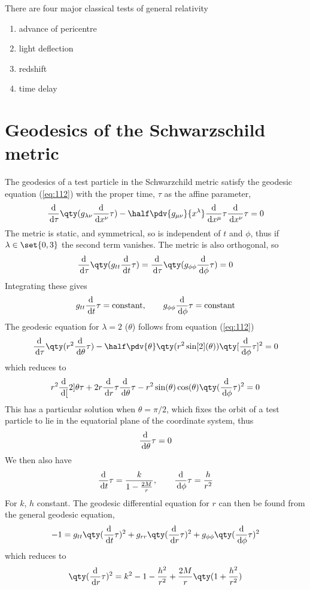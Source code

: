 There are four major classical tests of general relativity
\begin{enumerate}
\item advance of pericentre
\item light deflection
\item redshift
\item time delay
\end{enumerate}

\section{Geodesics of the Schwarzschild metric}
\label{sec:geod-schw-metr}

The geodesics of a test particle in the Schwarzchild metric satisfy
the geodesic equation (\ref{eq:112}) with the proper time, $\tau$ as
the affine parameter,
\begin{equation}
  \label{eq:141}
  \dv{\tau}\qty(g_{\lambda\nu} \dv{x^{\nu}}{\tau} ) - \half \pdv{g_{\mu \nu}}{x^{\lambda}} \dv{x^{\mu}}{\tau} \dv{x^{\nu}}{\tau} = 0
\end{equation}
The metric is static, and symmetrical, so is independent of $t$ and
$\phi$, thus if $\lambda \in \set{0,3}$ the second term vanishes. The
metric is also orthogonal, so
\[ \dv{\tau} \qty( g_{tt} \dv{t}{\tau}) = \dv{\tau} \qty( g_{\phi \phi} \dv{\phi}{\tau}) = 0 \]
Integrating these gives
\[ g_{tt} \frac{\mathrm{d}}{\,\mathrm{d} t}{\tau} = \text{constant}, \qquad g_{\phi \phi} \frac{\mathrm{d}}{\,\mathrm{d} \phi}{\tau} = \text{constant} \]
The geodesic equation for $\lambda=2$ ($\theta$) follows from equation (\ref{eq:112})
\begin{equation}
  \label{eq:142}
  \dv{\tau} \qty( r^2 \dv{\theta}{\tau} ) - \half  \pdv{\theta} \qty( r^2 \sin[2](\theta) )\qty[ \dv{\phi}{\tau}]^2 = 0 
\end{equation}
which reduces to
\begin{equation}
  \label{eq:143}
  r^2 \dv[2]{\theta}{\tau} + 2 r \dv{r}{\tau} \dv{\theta}{\tau} - r^2 \sin(\theta) \cos(\theta) \qty(\dv{\phi}{\tau})^2 = 0
\end{equation}
This has a particular solution when $\theta=\pi/2$, which fixes the
orbit of a test particle to lie in the equatorial plane of the
coordinate system, thus \[ \frac{\mathrm{d}}{\,\mathrm{d} \theta}{\tau} = 0 \] We then also have
\begin{equation}
  \label{eq:144}
  \frac{\mathrm{d}}{\,\mathrm{d} t}{\tau} = \frac{k}{1 - \frac{2M}{r}}, \qquad \frac{\mathrm{d}}{\,\mathrm{d} \phi}{\tau} = \frac{h}{r^2}
\end{equation}
For $k$, $h$ constant. The geodesic differential equation for $r$ can
then be found from the general geodesic equation, 
\begin{equation}
  \label{eq:145}
  -1 = g_{tt} \qty( \dv{t}{\tau} )^2 + g_{rr} \qty(\dv{r}{\tau})^2 + g_{\phi \phi} \qty( \dv{\phi}{\tau} )^2
\end{equation}
which reduces to
\begin{equation}
  \label{eq:146}
  \qty( \dv{r}{\tau} )^2 = k^2 - 1 - \frac{h^2}{r^2} + \frac{2M}{r} \qty(1+ \frac{h^2}{r^2})
\end{equation}


